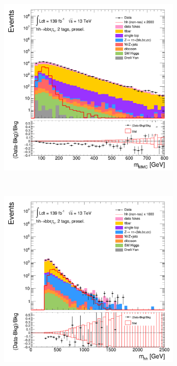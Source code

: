 \begin{figure}[htbp]
\begin{subfigure}{.32\textwidth}
\caption{}
\label{fig:MVAvariables:b}
\end{subfigure}
\begin{subfigure}{.32\textwidth}
\centering
\includegraphics[width=0.85\linewidth]{DiHiggs/plots/MVA/SLT_Final/HNone/BDTVarsPreselection/2/C_2tag2pjet_0ptv_mMMC_Log.png}
\caption{}
\label{fig:MVAvariables:c}
\end{subfigure}
\\
\begin{subfigure}{.32\textwidth}
\centering
\includegraphics[width=0.85\linewidth]{DiHiggs/plots/MVA/LTT_Final/HNone/BDTVarsPreselection/2/C_2tag2pjet_0ptv_Mhh_Log.png}

\end{subfigure}
\end{figure}
